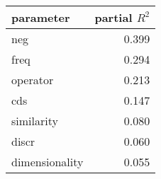 \begin{tabular}{lr}
\toprule
      parameter &  partial $R^2$ \\
\midrule
            neg &          0.399 \\
           freq &          0.294 \\
       operator &          0.213 \\
            cds &          0.147 \\
     similarity &          0.080 \\
          discr &          0.060 \\
 dimensionality &          0.055 \\
\bottomrule
\end{tabular}
